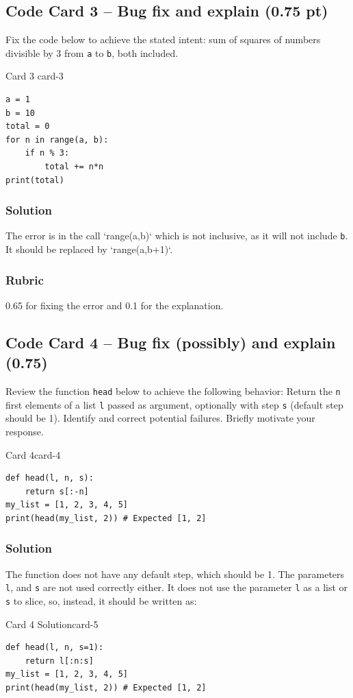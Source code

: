 \documentclass[10pt]{article}
\begin{document}
\subsection*{Code Card 3 -- Bug fix and explain (0.75 pt)}
Fix the code below to achieve the stated intent: sum of squares of numbers divisible by 3 from \verb|a| to \verb|b|, both included.

\begin{card}{ Card 3 }{card-3}
\begin{verbatim}
a = 1
b = 10
total = 0
for n in range(a, b):       
    if n % 3:               
        total += n*n
print(total)
\end{verbatim}
\end{card}

\subsubsection{Solution}
The error is in the call `range(a,b)` which is not inclusive, as it will not include \verb|b|. It should be replaced by `range(a,b+1)`.

\subsubsection{Rubric}
0.65 for fixing the error and 0.1 for the explanation. 

\subsection*{Code Card 4 -- Bug fix (possibly) and explain (0.75)}
Review the function \verb|head| below to achieve the following behavior: Return the \verb|n| first elements of a list \verb|l| passed as argument, optionally with step \verb|s| (default step should be 1). Identify and correct potential failures. Briefly motivate your response.

\begin{card}{ Card 4}{card-4}
\begin{verbatim}
def head(l, n, s):
    return s[:-n]    
my_list = [1, 2, 3, 4, 5]
print(head(my_list, 2)) # Expected [1, 2] 
\end{verbatim}
\end{card}

\subsubsection*{Solution}
The function does not have any default step, which should be 1. The parameters \verb|l|, and \verb|s| are not used correctly either. It does not use the parameter \verb|l| as a list or \verb|s| to slice, so, instead, it should be written as: 
\begin{card} { Card 4 Solution}{card-5}
\begin{verbatim}
def head(l, n, s=1):
    return l[:n:s]    
my_list = [1, 2, 3, 4, 5]
print(head(my_list, 2)) # Expected [1, 2]  
\end{verbatim}
\end{card}
\end{document}

